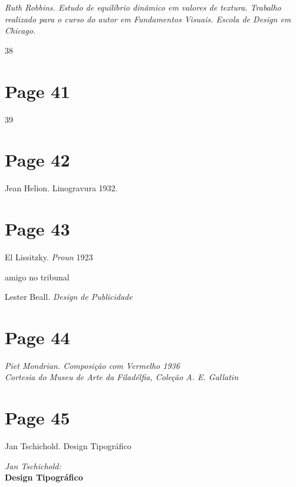 \documentclass[a4paper]{article}
\begin{document}
\textit{Ruth Robbins. Estudo de equilíbrio dinâmico em valores de textura. Trabalho realizado para o curso do autor em Fundamentos Visuais. Escola de Design em Chicago.}

38

\newpage
\section*{Page 41}

39

\newpage
\section*{Page 42}

Jean Helion. Linogravura 1932.

\newpage
\section*{Page 43}

El Lissitzky. \textit{Proun} 1923

amigo no tribunal

Lester Beall. \textit{Design de Publicidade}

\newpage
\section*{Page 44}

\noindent
\textit{Piet Mondrian. Composição com Vermelho 1936}\\
\textit{Cortesia do Museu de Arte da Filadélfia, Coleção A. E. Gallatin}

\vfill

\par

\newpage
\section*{Page 45}

Jan Tschichold. Design Tipográfico

\vspace*{10em} %

\begin{center}
\textit{Jan Tschichold:} \\ %
\vspace{1em} %
\textbf{\Large Design Tipográfico} %
\end{center}
\end{document}
